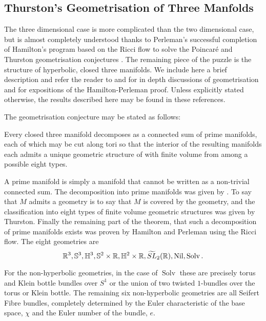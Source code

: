 \documentclass[a4paper, 12pt]{amsart}
\begin{document}
\subsection{Thurston's Geometrisation of Three Manfolds}
\label{sec:geometrisation_3d}

The three dimensional case is more complicated than the two dimensional case, but is almost completely understood thanks to Perleman's successful completion \cite{2003math......7245P,2003math......3109P,2002math.....11159P} of Hamilton's program based on the Ricci flow \cite{Hamilton:/1982} to solve the Poincar\'e and Thurston geometrisation conjectures \cite{MR648524}. The remaining piece of the puzzle is the structure of hyperbolic, closed three manifolds. We include here a brief description and refer the reader to \cite{MR705527} and \cite{MR1435975} for in depth discussions of geometrisation and \cite{MR3186136,MR2334563,MR2460872} for expositions of the Hamilton-Perleman proof. Unless explicitly stated otherwise, the results described here may be found in these references.

The geometrisation conjecture may be stated as follows:

\begin{thm}
Every closed three manifold decomposes as a connected sum of prime manifolds, each of which may be cut along tori so that the interior of the resulting manifolds each admits a unique geometric structure of with finite volume from among a possible eight types.
\end{thm}

A prime manifold is simply a manifold that cannot be written as a non-trivial connected sum. The decomposition into prime manifolds was given by \cite{MR0142125}. To say that \(M\) admits a geometry is to say that \(M\) is covered by the geometry, and the classification into eight types of finite volume geometric structures was given by Thurston. Finally the remaining part of the theorem, that such a decomposition of prime manifolds exists was proven by Hamilton and Perleman using the Ricci flow. The eight geometries are
\[
\mathbb{R}^3, \mathbb{S}^3, \mathbb{H}^3, \mathbb{S}^2 \times \mathbb{R}, \mathbb{H}^2 \times \mathbb{R}, \widetilde{SL}_2(\mathbb{R}), \operatorname{Nil}, \operatorname{Solv}.
\]

For the non-hyperbolic geometries, in the case of \(\operatorname{Solv}\) these are precisely torus and Klein bottle bundles over \(S^1\) or the union of two twisted \(1\)-bundles over the torus or Klein bottle. The remaining six non-hyperbolic geometries are all Seifert Fibre bundles, completely determined by the Euler characteristic of the base space, \(\chi\) and the Euler number of the bundle, \(e\).
\end{document}
